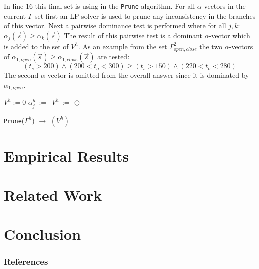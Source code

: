 \documentclass{article}
\begin{document}
In line 16 this final set is using in the \texttt{Prune} algorithm. For all $\alpha$-vectors in the current $\Gamma$-set first an LP-solver is used to prune any inconsistency in the branches of this vector. Next a pairwise dominance test is performed where for all $j,k$: 
$\alpha_j(\vec{s}) \geq \alpha_k(\vec{s})$
The result of this pairwise test is a dominant $\alpha$-vector which is added to the set of $V^h$. As an example from the set $\Gamma^2_{open,close}$ the two $\alpha$-vectors of $\alpha_{1,open}(\vec{s}) \geq \alpha_{1,close}(\vec{s})$ are tested: 
\begin{equation*}
(t_s>200) \wedge (200<t_o<300) \geq (t_s>150) \wedge (220<t_o<280)
\end{equation*}
The second $\alpha$-vector is omitted from the overall answer since it is dominated by $\alpha_{1,open}$.
\incmargin{.5em}
\linesnumbered
\begin{algorithm}[t!]
\vspace{-.5mm}
\Begin
{
   		$V^h :=0$ \;
       {
           $\alpha_j^h \,:=\,$ \;
           {
				{         
           			$V^h \,:=\,\oplus$  \; 
           		}  
           	}
       }
      \;
}
\caption{\footnotesize \texttt{Prune}($\Gamma^h$) $\longrightarrow$ $(V^h)$ }
\vspace{-1mm}
\end{algorithm}
\decmargin{.5em}
\section{Empirical Results}

\section{Related Work}  

\section{Conclusion}

 
 
\subsubsection*{References} 




 
\end{document}
